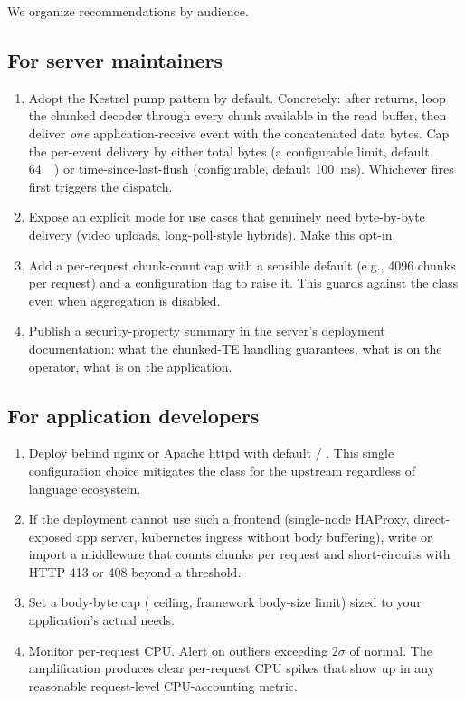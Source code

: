 We organize recommendations by audience.

\subsection{For server maintainers}
\label{sec:rec-server}

\begin{enumerate}
  \item Adopt the Kestrel pump pattern by default. Concretely:
    after  returns, loop the chunked decoder
    through every chunk available in the read buffer, then deliver
    \emph{one} application-receive event with the concatenated
    data bytes. Cap the per-event delivery by either total bytes
    (a configurable limit, default
    \SI{64}{\kibi\byte}) or time-since-last-flush (configurable,
    default \SI{100}{\milli\second}). Whichever fires first
    triggers the dispatch.
  \item Expose an explicit  mode for use cases
    that genuinely need byte-by-byte delivery (video uploads,
    long-poll-style hybrids). Make this opt-in.
  \item Add a per-request chunk-count cap with a sensible default
    (e.g., \num{4096} chunks per request) and a configuration
    flag to raise it. This guards against the class even when
    aggregation is disabled.
  \item Publish a security-property summary in the server's
    deployment documentation: what the chunked-TE handling
    guarantees, what is on the operator, what is on the
    application.
\end{enumerate}

\subsection{For application developers}
\label{sec:rec-app}

\begin{enumerate}
  \item Deploy behind nginx or Apache httpd with default
     / .
    This single configuration choice mitigates the class for the
    upstream regardless of language ecosystem.
  \item If the deployment cannot use such a frontend (single-node
    HAProxy, direct-exposed app server, kubernetes ingress without
    body buffering), write or import a middleware that counts
    chunks per request and short-circuits with HTTP 413 or 408
    beyond a threshold.
  \item Set a body-byte cap ( ceiling,
    framework body-size limit) sized to your application's actual
    needs.
  \item Monitor per-request CPU. Alert on outliers exceeding
    \(2\sigma\) of normal. The amplification produces clear
    per-request CPU spikes that show up in any reasonable
    request-level CPU-accounting metric.
\end{enumerate}

